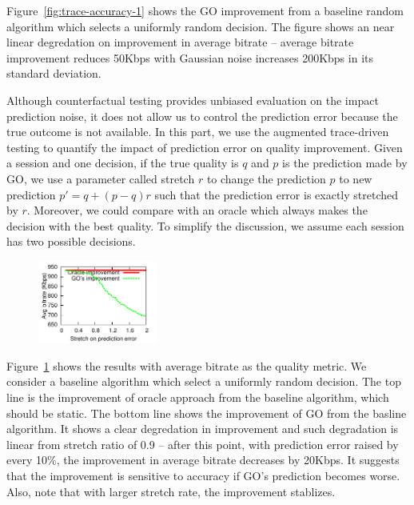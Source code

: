 Figure~\ref{fig:trace-accuracy-1} shows the GO improvement from a baseline random algorithm which selects a uniformly random decision. The figure shows an near linear degredation on improvement in average bitrate -- average bitrate improvement reduces 50Kbps with Gaussian noise increases 200Kbps in its standard deviation.



Although counterfactual testing provides unbiased evaluation on the impact prediction noise, it does not allow us to control the prediction error because the true outcome is not available. In this part, we use the augmented trace-driven testing to quantify the impact of prediction error on quality improvement. Given a session and one decision, if the true quality is $q$ and $p$ is the prediction made by GO, we use a parameter called stretch $r$ to change the prediction $p$ to new prediction $p'=q+(p-q)r$ such that the prediction error is exactly stretched by $r$. 
Moreover, we could compare with an oracle which always makes the decision with the best quality. To simplify the discussion, we assume each session has two  possible decisions. 

\begin{figure}[h!]
\centering
 \includegraphics[width=0.35\textwidth] {figures/newfig/trendAccuracy-metricId1-keyGlobal-partition.pdf}
\label{fig:trace-accuracy-2}
\end{figure}

Figure~\ref{fig:trace-accuracy-2} shows the results with average bitrate as the quality metric. We consider a baseline algorithm which select a uniformly random decision. The top line is the improvement of oracle approach from the baseline algorithm, which should be static. The bottom line shows the improvement of GO from the basline algorithm. 
It shows a clear degredation in improvement and such degradation is linear from stretch ratio of 0.9 -- after this point, with prediction error raised by every 10\%, the improvement in average bitrate decreases by 20Kbps. It suggests that the improvement is sensitive to accuracy if GO's prediction becomes worse. Also, note that with larger stretch rate, the improvement stablizes.



